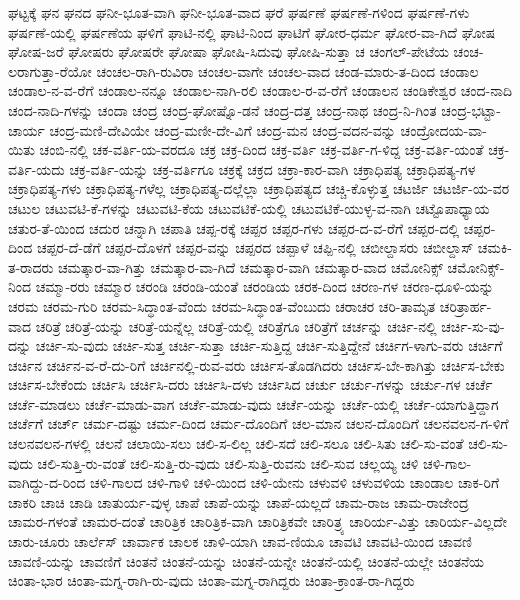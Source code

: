 {ಘಟ್ಟಕ್ಕೆ
ಘನ
ಘನದ
ಘನೀ-ಭೂತ-ವಾಗಿ
ಘನೀ-ಭೂತ-ವಾದ
ಘರೆ
ಘರ್ಷಣೆ
ಘರ್ಷಣೆ-ಗಳಿಂದ
ಘರ್ಷಣೆ-ಗಳು
ಘರ್ಷಣೆ-ಯಲ್ಲಿ
ಘರ್ಷಣೆಯ
ಘಳಿಗೆ
ಘಾಟಿ-ನಲ್ಲಿ
ಘಾಟಿ-ನಿಂದ
ಘಾಟಿಗೆ
ಘೋರ-ಧರ್ಮ
ಘೋರ-ವಾ-ಗಿದೆ
ಘೋಷ
ಘೋಷ-ಜರೆ
ಘೋಷರು
ಘೋಷರೇ
ಘೋಷಾ
ಘೋಷಿ-ಸಿದುವು
ಘೋಷಿ-ಸುತ್ತಾ
ಚ
ಚಂಗಲ್-ಪೇಟೆಯ
ಚಂಚ-ಲರಾಗುತ್ತಾ-ರೆಯೋ
ಚಂಚಲ-ರಾಗಿ-ರುವಿರಾ
ಚಂಚಲ-ವಾಗೇ
ಚಂಚಲ-ವಾದ
ಚಂಡ-ಮಾರು-ತ-ದಿಂದ
ಚಂಡಾಲ
ಚಂಡಾಲ-ನ-ವ-ರೆಗೆ
ಚಂಡಾಲ-ನನ್ನೂ
ಚಂಡಾಲ-ನಾಗಿ-ರಲಿ
ಚಂಡಾಲ-ರ-ವ-ರೆಗೆ
ಚಂಡಾಲನ
ಚಂಡಿಕೇಶ್ವರ
ಚಂದ-ನಾದಿ
ಚಂದ-ನಾದಿ-ಗಳನ್ನು
ಚಂದಾ
ಚಂದ್ರ
ಚಂದ್ರ-ಘೋಷ್ನೊ-ಡನೆ
ಚಂದ್ರ-ದತ್ತ
ಚಂದ್ರ-ನಾಥ
ಚಂದ್ರ-ನಿ-ಗಿಂತ
ಚಂದ್ರ-ಭಟ್ಟಾ-ಚಾರ್ಯ
ಚಂದ್ರ-ಮಣಿ-ದೇವಿಯೇ
ಚಂದ್ರ-ಮಣೀ-ದೇ-ವಿಗೆ
ಚಂದ್ರ-ಮನ
ಚಂದ್ರ-ವದನ-ವನ್ನು
ಚಂದ್ರೋದಯ-ವಾ-ಯಿತು
ಚಂಬಿ-ನಲ್ಲಿ
ಚಕ-ವರ್ತಿ-ಯ-ವರದೂ
ಚಕ್ರ
ಚಕ್ರ-ದಿಂದ
ಚಕ್ರ-ವರ್ತಿ
ಚಕ್ರ-ವರ್ತಿ-ಗ-ಳಿದ್ದ
ಚಕ್ರ-ವರ್ತಿ-ಯಂತೆ
ಚಕ್ರ-ವರ್ತಿ-ಯದು
ಚಕ್ರ-ವರ್ತಿ-ಯನ್ನು
ಚಕ್ರ-ವರ್ತಿಗೂ
ಚಕ್ರಕ್ಕೆ
ಚಕ್ರದ
ಚಕ್ರಾ-ಕಾರ-ವಾಗಿ
ಚಕ್ರಾಧಿಪತ್ಯ
ಚಕ್ರಾಧಿಪತ್ಯ-ಗಳ
ಚಕ್ರಾಧಿಪತ್ಯ-ಗಳು
ಚಕ್ರಾಧಿಪತ್ಯ-ಗಳೆಲ್ಲ
ಚಕ್ರಾಧಿಪತ್ಯ-ದಲ್ಲೆಲ್ಲಾ
ಚಕ್ರಾಧಿಪತ್ಯದ
ಚಚ್ಚಿ-ಕೊಳ್ಳುತ್ತ
ಚಟರ್ಜಿ
ಚಟರ್ಜಿ-ಯ-ವರ
ಚಟುಲ
ಚಟುವಟಿ-ಕೆ-ಗಳನ್ನು
ಚಟುವಟಿ-ಕೆಯ
ಚಟುವಟಿಕೆ-ಯಲ್ಲಿ
ಚಟುವಟಿಕೆ-ಯುಳ್ಳ-ವ-ನಾಗಿ
ಚಟ್ಟೊಪಾಧ್ಯಾಯ
ಚತುರ-ತೆ-ಯಿಂದ
ಚದುರ
ಚನ್ನಾಗಿ
ಚಪಾತಿ
ಚಪ್ಪ-ರಕ್ಕೆ
ಚಪ್ಪರ
ಚಪ್ಪರ-ಗಳು
ಚಪ್ಪರ-ದ-ವ-ರೆಗೆ
ಚಪ್ಪರ-ದಲ್ಲಿ
ಚಪ್ಪರ-ದಿಂದ
ಚಪ್ಪರ-ದೆ-ಡೆಗೆ
ಚಪ್ಪರ-ದೊಳಗೆ
ಚಪ್ಪರ-ವನ್ನು
ಚಪ್ಪರದ
ಚಪ್ಪಾಳೆ
ಚಪ್ಪಿ-ನಲ್ಲಿ
ಚಬೀಲ್ದಾಸರು
ಚಬೀಲ್ದಾಸ್
ಚಮಕಿ-ತ-ರಾದರು
ಚಮತ್ಕಾರ-ವಾ-ಗಿತ್ತು
ಚಮತ್ಕಾರ-ವಾ-ಗಿದೆ
ಚಮತ್ಕಾರ-ವಾಗಿ
ಚಮತ್ಕಾರ-ವಾದ
ಚಮೋನಿಕ್ಸ್
ಚಮೋನಿಕ್ಸ್-ನಿಂದ
ಚಮ್ಮಾ-ರರು
ಚಮ್ಮಾರ
ಚರಂಡಿ
ಚರಂಡಿ-ಯಂತೆ
ಚರಂಡಿಯ
ಚರಕ-ದಿಂದ
ಚರಣ-ಗಳ
ಚರಣ-ಧೂಳಿ-ಯನ್ನು
ಚರಮ
ಚರಮ-ಗುರಿ
ಚರಮ-ಸಿದ್ಧಾಂತ-ವೆಂದು
ಚರಮ-ಸಿದ್ಧಾಂತ-ವೆಂಬುದು
ಚರಾಚರ
ಚರಿ-ತಾಮೃತ
ಚರಿತ್ರಾರ್ಹ-ವಾದ
ಚರಿತ್ರೆ
ಚರಿತ್ರೆ-ಯನ್ನು
ಚರಿತ್ರೆ-ಯನ್ನೆಲ್ಲ
ಚರಿತ್ರೆ-ಯಲ್ಲಿ
ಚರಿತ್ರೆಗೂ
ಚರಿತ್ರೆಗೆ
ಚರ್ಚನ್ನು
ಚರ್ಚಿ-ನಲ್ಲಿ
ಚರ್ಚಿ-ಸು-ವು-ದನ್ನು
ಚರ್ಚಿ-ಸು-ವುದು
ಚರ್ಚಿ-ಸುತ್ತ
ಚರ್ಚಿ-ಸುತ್ತಾ
ಚರ್ಚಿ-ಸುತ್ತಿದ್ದ
ಚರ್ಚಿ-ಸುತ್ತಿದ್ದೇನೆ
ಚರ್ಚಿಗ-ಳಾಗು-ವರು
ಚರ್ಚಿಗೆ
ಚರ್ಚಿನ
ಚರ್ಚಿನ-ವ-ರೆ-ದು-ರಿಗೆ
ಚರ್ಚಿನಲ್ಲಿ-ರುವ-ವರು
ಚರ್ಚಿಸ-ತೊಡಗಿದರು
ಚರ್ಚಿಸ-ಬೇ-ಕಾಗಿತ್ತು
ಚರ್ಚಿಸ-ಬೇಕು
ಚರ್ಚಿಸ-ಬೇಕೆಂದು
ಚರ್ಚಿಸಿ
ಚರ್ಚಿಸಿ-ದರು
ಚರ್ಚಿಸಿ-ದಳು
ಚರ್ಚಿಸಿದ
ಚರ್ಚು
ಚರ್ಚು-ಗಳನ್ನು
ಚರ್ಚು-ಗಳ
ಚರ್ಚೆ
ಚರ್ಚೆ-ಮಾಡಲು
ಚರ್ಚೆ-ಮಾಡು-ವಾಗ
ಚರ್ಚೆ-ಮಾಡು-ವುದು
ಚರ್ಚೆ-ಯನ್ನು
ಚರ್ಚೆ-ಯಲ್ಲಿ
ಚರ್ಚೆ-ಯಾಗುತ್ತಿದ್ದಾಗ
ಚರ್ಚೆಗೆ
ಚರ್ಚ್
ಚರ್ಮ-ದಷ್ಟು
ಚರ್ಮ-ದಿಂದ
ಚರ್ಮ-ದೊಂದಿಗೆ
ಚಲ-ಮಾನ
ಚಲನ-ದೊಂದಿಗೆ
ಚಲನವಲನ-ಗ-ಳಿಗೆ
ಚಲನವಲನ-ಗಳಲ್ಲಿ
ಚಲನೆ
ಚಲಾಯಿ-ಸಲು
ಚಲಿ-ಸ-ಲಿಲ್ಲ
ಚಲಿ-ಸದೆ
ಚಲಿ-ಸಲೂ
ಚಲಿ-ಸಿತು
ಚಲಿ-ಸು-ವಂತೆ
ಚಲಿ-ಸು-ವುದು
ಚಲಿ-ಸುತ್ತಿ-ರು-ವಂತೆ
ಚಲಿ-ಸುತ್ತಿ-ರು-ವುದು
ಚಲಿ-ಸುತ್ತಿ-ರುವನು
ಚಲಿ-ಸುವ
ಚಲ್ಲಯ್ಯ
ಚಳಿ
ಚಳಿ-ಗಾಲ-ವಾಗಿದ್ದು-ದ-ರಿಂದ
ಚಳಿ-ಗಾಲದ
ಚಳಿ-ಗಾಳಿ
ಚಳಿ-ಯಿಂದ
ಚಳಿ-ಯೇನು
ಚಳುವಳಿ
ಚಳುವಳಿಯ
ಚಾಂಡಾಲ
ಚಾಕ-ರಿಗೆ
ಚಾಕರಿ
ಚಾಚಿ
ಚಾಡಿ
ಚಾತುರ್ಯ-ವುಳ್ಳ
ಚಾಪೆ
ಚಾಪೆ-ಯನ್ನು
ಚಾಪೆ-ಯಲ್ಲದೆ
ಚಾಮ-ರಾಜ
ಚಾಮ-ರಾಜೇಂದ್ರ
ಚಾಮರ-ಗಳಂತೆ
ಚಾಮರ-ದಂತೆ
ಚಾರಿತ್ರಿಕ
ಚಾರಿತ್ರಿಕ-ವಾಗಿ
ಚಾರಿತ್ರಿಕವೇ
ಚಾರಿತ್ರ್ಯ
ಚಾರಿರ್ಯ-ವಿತ್ತು
ಚಾರಿರ್ಯ-ವಿಲ್ಲದೇ
ಚಾರು-ಚೂರು
ಚಾರ್ಲೆಸ್
ಚಾರ್ವಾಕ
ಚಾಲಕ
ಚಾಳಿ-ಯಾಗಿ
ಚಾವ-ಣಿಯೂ
ಚಾವಟಿ
ಚಾವಟಿ-ಯಿಂದ
ಚಾವಣಿ
ಚಾವಣಿ-ಯನ್ನು
ಚಾವಣಿಗೆ
ಚಿಂತನೆ
ಚಿಂತನೆ-ಯನ್ನು
ಚಿಂತನೆ-ಯನ್ನೇ
ಚಿಂತನೆ-ಯಲ್ಲಿ
ಚಿಂತನೆ-ಯಲ್ಲೇ
ಚಿಂತನೆಯ
ಚಿಂತಾ-ಭಾರ
ಚಿಂತಾ-ಮಗ್ನ-ರಾಗಿ-ರು-ವುದು
ಚಿಂತಾ-ಮಗ್ನ-ರಾಗಿದ್ದರು
ಚಿಂತಾ-ಕ್ರಾಂತ-ರಾ-ಗಿದ್ದರು
}
